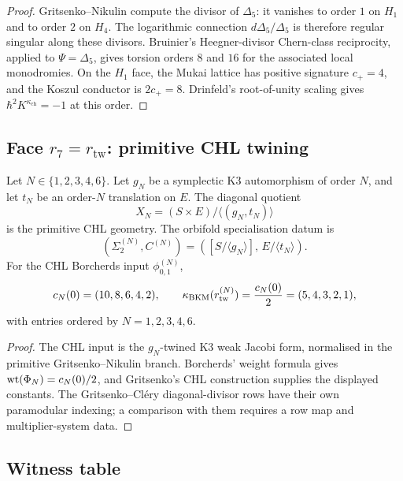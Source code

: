\begin{proof}
Gritsenko--Nikulin compute the divisor of \(\Delta_5\): it vanishes to
order \(1\) on \(H_1\) and to order \(2\) on \(H_4\).  The logarithmic
connection \(d\Delta_5/\Delta_5\) is therefore regular singular along
these divisors.  Bruinier's Heegner-divisor Chern-class reciprocity,
applied to \(\Psi=\Delta_5\), gives torsion orders \(8\) and \(16\) for
the associated local monodromies.  On the \(H_1\) face, the Mukai lattice
has positive signature \(c_+=4\), and the Koszul conductor is
\(2c_+=8\).  Drinfeld's root-of-unity scaling gives
\(\hbar^2K^{\kappa_{\mathrm{ch}}}=-1\) at this order.
\end{proof}

\subsection{Face $r_7=r_{\mathrm{tw}}$: primitive CHL twining}
\label{wn:subsec:r7-twined}

\begin{proposition}[$r_{\mathrm{tw}}$]
\label{wn:prop:r7-twined-witness}
Let \(N\in\{1,2,3,4,6\}\).  Let \(g_N\) be a symplectic K3 automorphism
of order \(N\), and let \(t_N\) be an order-\(N\) translation on \(E\).
The diagonal quotient
\[
  X_N=(S\times E)/\langle(g_N,t_N)\rangle
\]
is the primitive CHL geometry.  The orbifold specialisation datum is
\[
  (\Sigma_2^{(N)},C^{(N)})
  =
  ([S/\langle g_N\rangle],\,E/\langle t_N\rangle).
\]
For the CHL Borcherds input \(\phi_{0,1}^{(N)}\),
\[
  c_N(0)=(10,8,6,4,2),\qquad
  \kappa_{\mathrm{BKM}}(r_{\mathrm{tw}}^{(N)})
  =\frac{c_N(0)}2
  =(5,4,3,2,1),
\]
with entries ordered by \(N=1,2,3,4,6\).
\end{proposition}

\begin{proof}
The CHL input is the \(g_N\)-twined K3 weak Jacobi form, normalised in
the primitive Gritsenko--Nikulin branch.  Borcherds' weight formula gives
\(\mathrm{wt}(\Phi_N)=c_N(0)/2\), and Gritsenko's CHL construction supplies the
displayed constants.  The Gritsenko--Cl\'ery diagonal-divisor rows have
their own paramodular indexing; a comparison with them requires a row
map and multiplier-system data.
\end{proof}

\subsection{Witness table}
\label{wn:subsec:witness-table}

